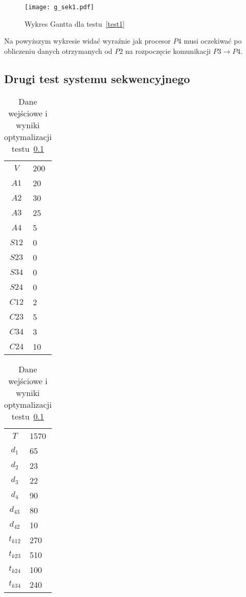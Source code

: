 \begin{figure}[H]
\centering
\texttt{[image: g\_sek1.pdf]}
\caption{Wykres Gantta dla testu~\ref{test1}}
\label{fig:res_1b}
\end{figure}

Na powyższym wykresie widać wyraźnie jak procesor $P4$ musi oczekiwać po obliczeniu danych otrzymanych od $P2$ na rozpoczęcie komunikacji $P3 \to P4$.

\subsection{Drugi test systemu sekwencyjnego} \label{test2}

\begin{table}[H]
\begin{minipage}[b]{0.5\linewidth}
\centering
\begin{tabular}{c l}
$V$ & 200 \\
$A1$ & 20 \\
$A2$ & 30 \\
$A3$ & 25 \\
$A4$ & 5 \\
$S12$ & 0 \\
$S23$ & 0 \\
$S34$ & 0 \\
$S24$ & 0 \\
$C12$ & 2 \\
$C23$ & 5 \\
$C34$ & 3 \\
$C24$ & 10 \\
\end{tabular}
\end{minipage}
\hspace{0.5cm}
\begin{minipage}[b]{0.5\linewidth}
\centering
\begin{tabular}{c l}
$T$ & 1570 \\
$d_{1}$ & 65 \\
$d_{2}$ & 23 \\
$d_{3}$ & 22 \\
$d_{4}$ & 90 \\
$d_{43}$ & 80 \\
$d_{42}$ & 10 \\
$t_{k12}$ & 270 \\
$t_{k23}$ & 510 \\
$t_{k24}$ & 100 \\
$t_{k34}$ & 240 \\
\end{tabular}
\end{minipage}
\caption{Dane wejściowe i wyniki optymalizacji testu~\ref{test2}}
\label{tab:res_2a}
\end{table}

